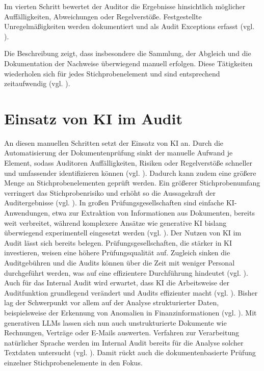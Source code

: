 Im vierten Schritt bewertet der Auditor die Ergebnisse hinsichtlich möglicher Auffälligkeiten, Abweichungen oder Regelverstöße. Festgestellte Unregelmäßigkeiten werden dokumentiert und als Audit Exceptions erfasst (vgl. \cites[S.~48 f.]{baumeister2019sample}{freudenberg2026auditsample}).

Die Beschreibung zeigt, dass insbesondere die Sammlung, der Abgleich und die Dokumentation der Nachweise überwiegend manuell erfolgen. Diese Tätigkeiten wiederholen sich für jedes Stichprobenelement und sind entsprechend zeitaufwendig (vgl. \cite[S.~66 f.]{baumeister2019sample}).


\section{Einsatz von KI im Audit}
\label{sec:ki_audit}

An diesen manuellen Schritten setzt der Einsatz von \ac{KI} an. Durch die Automatisierung der Dokumentenprüfung sinkt der manuelle Aufwand je Element, sodass Auditoren Auffälligkeiten, Risiken oder Regelverstöße schneller und umfassender identifizieren können (vgl. \cite[S.~11 f.]{wassie2024artificial}). Dadurch kann zudem eine größere Menge an Stichprobenelementen geprüft werden. Ein größerer Stichprobenumfang verringert das Stichprobenrisiko und erhöht so die Aussagekraft der Auditergebnisse (vgl. \cite[S.~183]{isa530}). In großen Prüfungsgesellschaften sind einfache \ac{KI}-Anwendungen, etwa zur Extraktion von Informationen aus Dokumenten, bereits weit verbreitet, während komplexere Ansätze wie generative \ac{KI} bislang überwiegend experimentell eingesetzt werden (vgl. \cite[S.~2]{KOKINA2025100734}). Der Nutzen von \ac{KI} im Audit lässt sich bereits belegen. Prüfungsgesellschaften, die stärker in \ac{KI} investieren, weisen eine höhere Prüfungsqualität auf. Zugleich sinken die Auditgebühren und die Audits können über die Zeit mit weniger Personal durchgeführt werden, was auf eine effizientere Durchführung hindeutet (vgl. \cite[S.~940\,f.]{fedyk2022}). Auch für das Internal Audit wird erwartet, dass \ac{KI} die Arbeitsweise der Auditfunktion grundlegend verändert und Audits effizienter macht (vgl. \cite[S.~12]{wassie2024artificial}). Bisher lag der Schwerpunkt vor allem auf der Analyse strukturierter Daten, beispielsweise der Erkennung von Anomalien in Finanzinformationen (vgl. \cite[S.~2]{KOKINA2025100734}). Mit generativen \acp{LLM} lassen sich nun auch unstrukturierte Dokumente wie Rechnungen, Verträge oder E-Mails auswerten. Verfahren zur Verarbeitung natürlicher Sprache werden im Internal Audit bereits für die Analyse solcher Textdaten untersucht (vgl. \cite[S.~1]{schumann2021natural}). Damit rückt auch die dokumentenbasierte Prüfung einzelner Stichprobenelemente in den Fokus.

